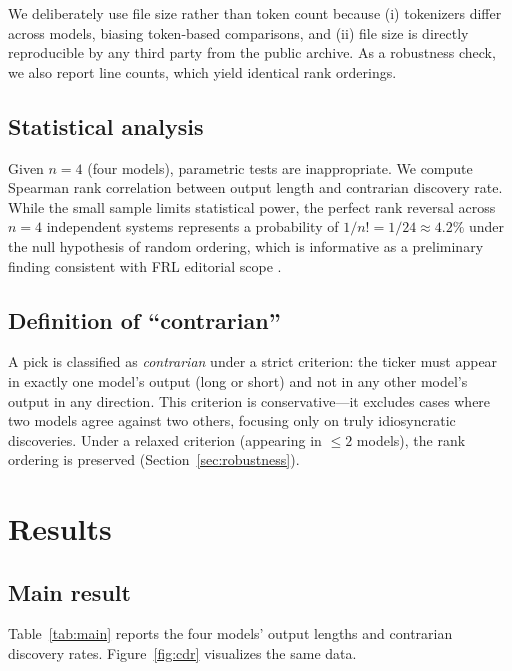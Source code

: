 \documentclass[11pt,letterpaper]{article}
\begin{document}
We deliberately use file size rather than token count because (i) tokenizers differ across models, biasing token-based comparisons, and (ii) file size is directly reproducible by any third party from the public archive. As a robustness check, we also report line counts, which yield identical rank orderings.

\subsection{Statistical analysis}

Given $n=4$ (four models), parametric tests are inappropriate. We compute Spearman rank correlation between output length and contrarian discovery rate. While the small sample limits statistical power, the perfect rank reversal across $n=4$ independent systems represents a probability of $1/n!=1/24\approx 4.2\%$ under the null hypothesis of random ordering, which is informative as a preliminary finding consistent with FRL editorial scope \citep{elsevier2026}.

\subsection{Definition of ``contrarian''}

A pick is classified as \textit{contrarian} under a strict criterion: the ticker must appear in exactly one model's output (long or short) and not in any other model's output in any direction. This criterion is conservative---it excludes cases where two models agree against two others, focusing only on truly idiosyncratic discoveries. Under a relaxed criterion (appearing in $\leq 2$ models), the rank ordering is preserved (Section~\ref{sec:robustness}).

\section{Results}\label{sec:results}

\subsection{Main result}

Table~\ref{tab:main} reports the four models' output lengths and contrarian discovery rates. Figure~\ref{fig:cdr} visualizes the same data.
\end{document}

